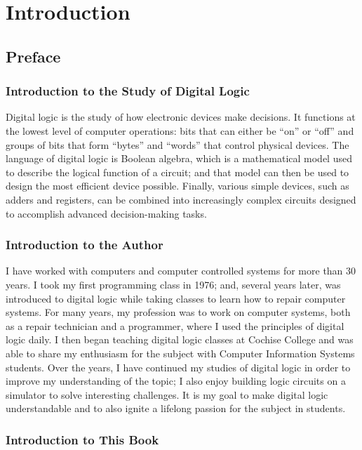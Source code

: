 \chapter{Introduction}\label{ch01}
\section{Preface}
\subsection{Introduction to the Study of Digital Logic}

Digital logic is the study of how electronic devices make decisions. It functions at the lowest level of computer operations: bits that can either be ``on'' or ``off'' and groups of bits that form ``bytes'' and ``words'' that control physical devices. The language of digital logic is Boolean algebra, which is a mathematical model used to describe the logical function of a circuit; and that model can then be used to design the most efficient device possible. Finally, various simple devices, such as adders and registers, can be combined into increasingly complex circuits designed to accomplish advanced decision-making tasks.

\subsection{Introduction to the Author}

I have worked with computers and computer controlled systems for more than 30 years. I took my first programming class in 1976; and, several years later, was introduced to digital logic while taking classes to learn how to repair computer systems. For many years, my profession was to work on computer systems, both as a repair technician and a programmer, where I used the principles of digital logic daily. I then began teaching digital logic classes at Cochise College and was able to share my enthusiasm for the subject with Computer Information Systems students. Over the years, I have continued my studies of digital logic in order to improve my understanding of the topic; I also enjoy building logic circuits on a simulator to solve interesting challenges. It is my goal to make digital logic understandable and to also ignite a lifelong passion for the subject in students.

\subsection{Introduction to This Book}

